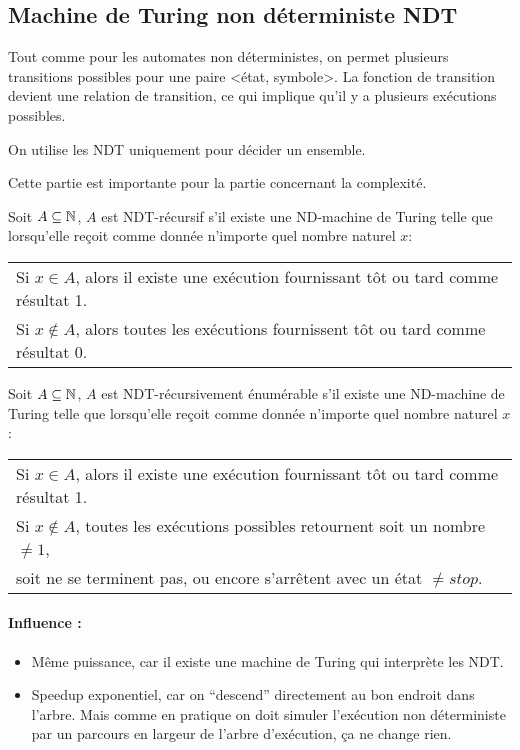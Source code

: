 \subsection{Machine de Turing non déterministe NDT}
Tout comme pour les automates non déterministes, on permet plusieurs
transitions possibles pour une paire <état, symbole>. La fonction de transition
devient une relation de transition, ce qui implique qu'il y a plusieurs
 exécutions possibles.

\begin{myrem}
	On utilise les NDT uniquement pour décider un ensemble.
\end{myrem}

\begin{myrem}
	Cette partie est importante pour la partie concernant la complexité.
\end{myrem}

\begin{mydef} Soit $A\subseteq \mathbb{N}$, $A$ est NDT-récursif s'il
	existe une ND-machine de Turing telle que lorsqu'elle reçoit comme
	donnée n'importe quel nombre naturel $x$:\\
	\begin{tabular}{l}
		Si $x\in A$, alors il existe une exécution fournissant tôt ou
		tard comme résultat 1.\\
		Si $x\notin A$, alors toutes les exécutions fournissent tôt ou
		tard comme résultat 0.\\
	\end{tabular}
\end{mydef}

\begin{mydef} Soit $A\subseteq \mathbb{N}$, $A$ est
	NDT-récursivement énumérable s'il
	existe une ND-machine de Turing telle que lorsqu'elle reçoit comme
	donnée n'importe quel nombre naturel $x$:\\
	\begin{tabular}{l}
		Si $x\in A$, alors il existe une exécution fournissant tôt ou
		tard comme résultat 1.\\
		Si $x\notin A$, toutes les exécutions possibles retournent soit un
		nombre $\neq 1$, \\
		soit ne se terminent pas, ou encore s'arrêtent avec
		un état $\neq stop$.\\
	\end{tabular}
\end{mydef}

\paragraph{Influence :}
\begin{itemize}
	\item Même puissance, car il existe une machine de Turing qui interprète
	 les NDT.
	\item Speedup exponentiel, car on ``descend'' directement au bon endroit
		dans l'arbre. Mais comme en pratique on doit simuler
		l'exécution non déterministe par un parcours en largeur de l'arbre d'exécution,
		 ça ne change rien.
\end{itemize}

